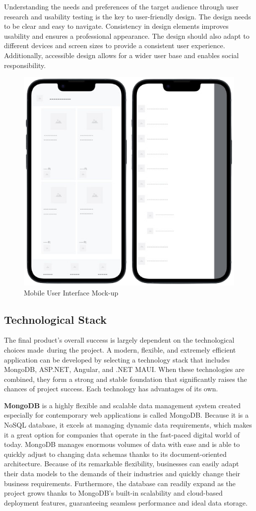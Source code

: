 Understanding the needs and preferences of the target audience through user research and usability testing is the key to user-friendly design. The design needs to be clear and easy to navigate. Consistency in design elements improves usability and ensures a professional appearance. The design should also adapt to different devices and screen sizes to provide a consistent user experience. Additionally,  accessible design allows for a wider user base and enables social responsibility. \cite{userFriendly}

\begin{figure}[H]
	\centering
	\includegraphics[width=0.3\linewidth]{img/ui_mockup.png}
	\caption{Mobile User Interface Mock-up}
	\label{fig:ur5}
\end{figure}

\subsection{Technological Stack}

The final product's overall success is largely dependent on the technological choices made during the project. A modern, flexible, and extremely efficient application can be developed by selecting a technology stack that includes MongoDB, ASP.NET, Angular, and .NET MAUI. When these technologies are combined, they form a strong and stable foundation that significantly raises the chances of project success. Each technology has advantages of its own.

\textbf{MongoDB} is a highly flexible and scalable data management system created especially for contemporary web applications is called {MongoDB}. Because it is a NoSQL database, it excels at managing dynamic data requirements, which makes it a great option for companies that operate in the fast-paced digital world of today. MongoDB manages enormous volumes of data with ease and is able to quickly adjust to changing data schemas thanks to its document-oriented architecture. Because of its remarkable flexibility, businesses can easily adapt their data models to the demands of their industries and quickly change their business requirements. Furthermore, the database can readily expand as the project grows thanks to MongoDB's built-in scalability and cloud-based deployment features, guaranteeing seamless performance and ideal data storage.

